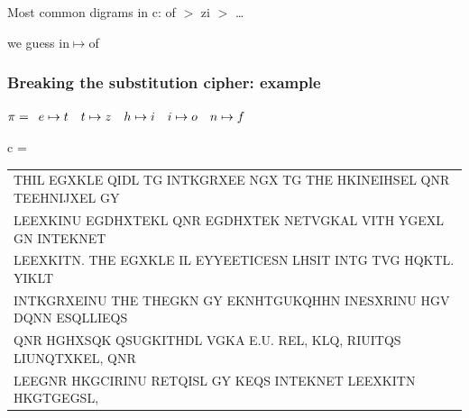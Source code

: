 \documentclass[aspectratio=169, lualatex, 10pt,dvipsnames,svgnames]{beamer} %
\def\enbleu#1{\textcolor{bleu}{#1}}
\def\enrouge#1{\textcolor{rouge}{#1}}
\begin{document}
\begin{frame}
  \color{black}\normalsize{Most common digrams in c: of $>$ zi $>$ \dots}
  \pause

  we guess in$\mapsto$of
  
  \color{black}
\end{frame}

\begin{frame}
  \frametitle{Breaking the substitution cipher: example}
  
    \enrouge{
    \tiny{$\pi=
      \begin{array}[t]{l}
      e\mapsto t\quad t\mapsto z \quad h\mapsto i\quad i\mapsto o\quad n\mapsto f
      \end{array}
      $}}
  \vspace{0.25cm}

  \color{vert}
  \tiny{c =
    \begin{tabular}[t]{l}
      \enbleu{T}\enbleu{H}\enbleu{I}L EGXKL\enbleu{E} Q\enbleu{I}DL \enbleu{T}G \enbleu{I}\enbleu{N}\enbleu{T}KGRXE\enbleu{E} NGX \enbleu{T}G \enbleu{T}\enbleu{H}\enbleu{E} HK\enbleu{I}\enbleu{N}E\enbleu{I}HS\enbleu{E}L Q\enbleu{N}R \enbleu{T}\enbleu{E}E\enbleu{H}\enbleu{N}\enbleu{I}JX\enbleu{E}L GY \\
      L\enbleu{E}EXK\enbleu{I}\enbleu{N}U EGDHX\enbleu{T}\enbleu{E}KL Q\enbleu{N}R EGDHX\enbleu{T}\enbleu{E}K \enbleu{N}\enbleu{E}\enbleu{T}VGKAL V\enbleu{I}\enbleu{T}\enbleu{H} YGEXL G\enbleu{N} \enbleu{I}\enbleu{N}\enbleu{T}\enbleu{E}K\enbleu{N}\enbleu{E}\enbleu{T} \\
      L\enbleu{E}EXK\enbleu{I}\enbleu{T}N. \enbleu{T}\enbleu{H}\enbleu{E} EGXKL\enbleu{E} \enbleu{I}L \enbleu{E}YY\enbleu{E}E\enbleu{T}\enbleu{I}C\enbleu{E}SN LHS\enbleu{I}\enbleu{T} \enbleu{I}\enbleu{N}\enbleu{T}G \enbleu{T}VG HQK\enbleu{T}L. Y\enbleu{I}KL\enbleu{T} \\
      \enbleu{I}\enbleu{N}\enbleu{T}KGRXE\enbleu{I}\enbleu{N}U \enbleu{T}\enbleu{H}\enbleu{E} \enbleu{T}\enbleu{H}\enbleu{E}GKN GY EKNH\enbleu{T}GUKQH\enbleu{H}N \enbleu{I}\enbleu{N}ESXR\enbleu{I}\enbleu{N}U \enbleu{H}GV DQ\enbleu{N}N ESQLL\enbleu{I}EQS \\
      Q\enbleu{N}R HGHXSQK QSUGK\enbleu{I}\enbleu{T}\enbleu{H}DL VGKA \enbleu{E}.U. R\enbleu{E}L, KLQ, R\enbleu{I}U\enbleu{I}\enbleu{T}QS L\enbleu{I}U\enbleu{N}Q\enbleu{T}XK\enbleu{E}L, Q\enbleu{N}R \\
      L\enbleu{E}EG\enbleu{N}R HKGC\enbleu{I}R\enbleu{I}\enbleu{N}U R\enbleu{E}\enbleu{T}Q\enbleu{I}SL GY K\enbleu{E}QS \enbleu{I}\enbleu{N}\enbleu{T}\enbleu{E}K\enbleu{N}\enbleu{E}\enbleu{T} L\enbleu{E}EXK\enbleu{I}\enbleu{T}N HKG\enbleu{T}GEGSL, \\

\end{tabular}}
\end{frame}
\end{document}
